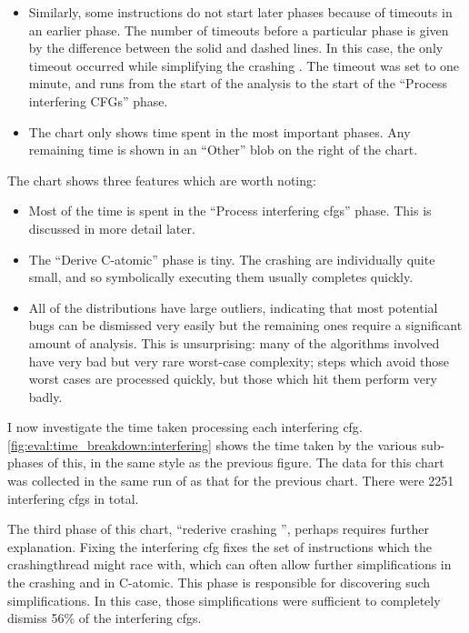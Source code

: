 \begin{itemize}
\item Similarly, some instructions do not start later phases because
  of timeouts in an earlier phase.  The number of timeouts before a
  particular phase is given by the difference between the solid and
  dashed lines.  In this case, the only timeout occurred while
  simplifying the crashing {\StateMachine}.  The timeout was set to
  one minute, and runs from the start of the analysis to the start of
  the ``Process interfering CFGs'' phase.

\item The chart only shows time spent in the most important phases.
  Any remaining time is shown in an ``Other'' blob on the right of the
  chart.
\end{itemize}

The chart shows three features which are worth noting:

\begin{itemize}
\item Most of the time is spent in the ``Process interfering
  \glspl{cfg}'' phase.  This is discussed in more detail later.
\item The ``Derive C-atomic'' phase is tiny.  The crashing
  {\StateMachines} are individually quite small, and so symbolically
  executing them usually completes quickly.
\item All of the distributions have large outliers, indicating that
  most potential bugs can be dismissed very easily but the remaining
  ones require a significant amount of analysis.  This is
  unsurprising: many of the algorithms involved have very bad but very
  rare worst-case complexity; steps which avoid those worst cases are
  processed quickly, but those which hit them perform very badly.
\end{itemize}

I now investigate the time taken processing each interfering
\gls{cfg}.  \autoref{fig:eval:time_breakdown:interfering} shows the
time taken by the various sub-phases of this, in the same style as the
previous figure.  The data for this chart was collected in the same
run of {\implementation} as that for the previous chart.  There were
2251 interfering \glspl{cfg} in total.

The third phase of this chart, ``rederive crashing {\StateMachine}'',
perhaps requires further explanation.  Fixing the interfering
\gls{cfg} fixes the set of instructions which the \gls{crashingthread}
might race with, which can often allow further simplifications in the
crashing {\StateMachine} and in C-atomic.  This phase is responsible
for discovering such simplifications.  In this case, those
simplifications were sufficient to completely dismiss 56\% of the
interfering \glspl{cfg}.

